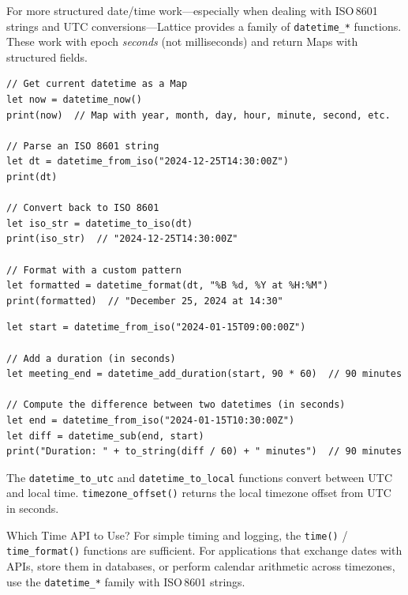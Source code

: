 
For more structured date/time work---especially when dealing with ISO\,8601
strings and UTC conversions---Lattice provides a family of
\lstinline|datetime_*| functions. These work with epoch \emph{seconds} (not
milliseconds) and return Maps with structured fields.

\begin{lstlisting}[language=Lattice, caption={Working with ISO 8601 dates}]
// Get current datetime as a Map
let now = datetime_now()
print(now)  // Map with year, month, day, hour, minute, second, etc.

// Parse an ISO 8601 string
let dt = datetime_from_iso("2024-12-25T14:30:00Z")
print(dt)

// Convert back to ISO 8601
let iso_str = datetime_to_iso(dt)
print(iso_str)  // "2024-12-25T14:30:00Z"

// Format with a custom pattern
let formatted = datetime_format(dt, "%B %d, %Y at %H:%M")
print(formatted)  // "December 25, 2024 at 14:30"
\end{lstlisting}

\begin{lstlisting}[language=Lattice, caption={Duration arithmetic with datetime}]
let start = datetime_from_iso("2024-01-15T09:00:00Z")

// Add a duration (in seconds)
let meeting_end = datetime_add_duration(start, 90 * 60)  // 90 minutes

// Compute the difference between two datetimes (in seconds)
let end = datetime_from_iso("2024-01-15T10:30:00Z")
let diff = datetime_sub(end, start)
print("Duration: " + to_string(diff / 60) + " minutes")  // 90 minutes
\end{lstlisting}

The \lstinline|datetime_to_utc| and \lstinline|datetime_to_local| functions
convert between UTC and local time. \lstinline|timezone_offset()| returns the
local timezone offset from UTC in seconds.

\begin{tipbox}{Which Time API to Use?}
For simple timing and logging, the \lstinline|time()| / \lstinline|time_format()|
functions are sufficient. For applications that exchange dates with APIs,
store them in databases, or perform calendar arithmetic across timezones,
use the \lstinline|datetime_*| family with ISO\,8601 strings.
\end{tipbox}


